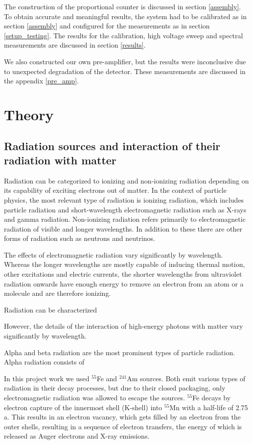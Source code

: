 \documentclass[a4paper]{article}
\begin{document}
The construction of the proportional counter is discussed in section \ref{assembly}.
To obtain accurate and meaningful results, the system had to be calibrated as in section \ref{assembly} and configured for the measurements as in section \ref{setup_testing}.
The results for the calibration, high voltage sweep and spectral measurements are discussed in section \ref{results}.

We also constructed our own pre-amplifier, but the results were inconclusive due to unexpected degradation of the detector.
These measurements are discussed in the appendix \ref{pre_amp}.


\section{Theory}
\label{theory}

\subsection{Radiation sources and interaction of their radiation with matter}
Radiation can be categorized to ionizing and non-ionizing radiation depending on its capability of exciting electrons out of matter.
In the context of particle physics, the most relevant type of radiation is ionizing radiation, which includes particle radiation and short-wavelength electromagnetic radiation such as X-rays and gamma radiation.
Non-ionizing radiation refers primarily to electromagnetic radiation of visible and longer wavelengths.
In addition to these there are other forms of radiation such as neutrons and neutrinos.

The effects of electromagnetic radiation vary significantly by wavelength.
Whereas the longer wavelengths are mostly capable of inducing thermal motion, other excitations and electric currents, the shorter wavelengths from ultraviolet radiation onwards have enough energy to remove an electron from an atom or a molecule and are therefore ionizing.

Radiation can be characterized
\cite{knoll_radiation_2010}

However, the details of the interaction of high-energy photons with matter vary significantly by wavelength.

Alpha and beta radiation are the most prominent types of particle radiation.
Alpha radiation consists of 

In this project work we used $^{55}$Fe and $^{241}$Am sources.
Both emit various types of radiation in their decay processes, but due to their closed packaging, only electromagnetic radiation was allowed to escape the sources.
$^{55}$Fe decays by electron capture of the innermost shell (K-shell) into $^{55}$Mn with a half-life of 2.75 a.
This results in an electron vacancy, which gets filled by an electron from the outer shells, resulting in a sequence of electron transfers, the energy of which is released as Auger electrons and X-ray emissions.
\end{document}
